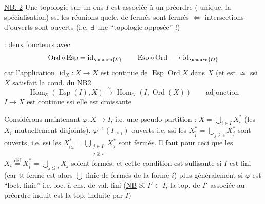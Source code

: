 \uline{NB. 2} Une topologie sur un ens $I$ est associée à
un préordre ( unique, 
la spécialisation) ssi les réunions quelc. de
fermés sont fermés $\Longleftrightarrow$ intersections d'ouverts
sont ouverts (i.e. $\exists$ une ``topologie opposée'' !)

 : deux foncteurs
avec
\[
\operatorname{Ord}\circ\operatorname{Esp}=\operatorname{id}_{\unsure{\mathcal E}}
\qquad
\operatorname{Esp}\circ\operatorname{Ord}\longrightarrow\operatorname{id}_{\unsure{\mathcal O}}
\]
car l'application $\operatorname{id}_X:X\longrightarrow X$
est continue de $\operatorname{Esp}\operatorname{Ord}X$
dans $X$ (et est $\simeq$ ssi $X$
satisfait la cond. du NB2
\[
\operatorname{Hom}_{\mathcal E}(\operatorname{Esp}(I),X)\xrightarrow{\sim}
\operatorname{Hom}_{\mathcal O}(I,\operatorname{Ord}(X))\qquad\text{adjonction}
\]
$I\longrightarrow X$ est continue ssi elle est croissante

Considérons maintenant $\varphi:X\longrightarrow I$, i.e. une pseudo-partition : $X=\bigcup_{i\in I}X_i^*$
(les $X_i$ mutuellement disjoints).  
$\varphi^{-1}(I_{\geq i})$ ouverts
 i.e. ssi les $X_{\widetilde i}^*=\bigcup_{j\geq i}X_j^*$ sont ouverts, i.e. ssi les
$X_{\complement\widetilde i}^*=\bigcup_{\substack{j\in I\\j\not\geq i}}X_j^*$
sont fermés. Il faut pour ceci que les
$X_i\overset{\mathrm{déf}}=X_{\overline i}^*=\bigcup_{j\leq i}X_j$
soient fermés, et cette condition est suffisante
si $I$ est fini (car tt fermé est alors $\bigcup$ finie de fermés de la forme $\overline i$)
plus généralement si $\varphi$ est ``loct. finie'' i.e. loc. à ens. de val. fini
(\uline{NB} Si $I'\subset I$, la top. de $I'$ associée au préordre induit est la top. induite
par $I$)


